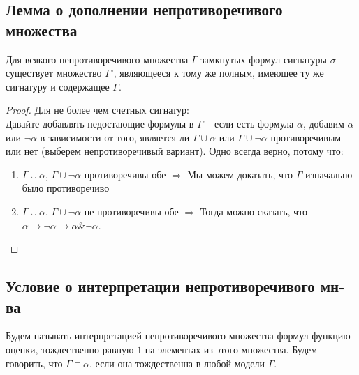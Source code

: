 \subsection{Лемма о дополнении непротиворечивого множества}
\label{sec-8-2}
\begin{lemma}
Для всякого непротиворечивого множества $\Gamma$ замкнутых формул сигнатуры $\sigma$ существует множество $\Gamma’$, являющееся к тому же полным, имеющее ту же сигнатуру и содержащее $\Gamma$.
\end{lemma}
\begin{proof}
Для не более чем счетных сигнатур:\\
Давайте добавлять недостающие формулы в $\Gamma$ -- если есть формула $\alpha$, добавим $\alpha$ или $\neg \alpha$ в зависимости от того, является ли $\Gamma \cup \alpha$ или $\Gamma \cup \neg \alpha$ противоречивым или нет (выберем непротиворечивый вариант). Одно всегда верно, потому что:
\begin{enumerate}
\item $\Gamma \cup \alpha$, $\Gamma \cup \neg \alpha$ противоречивы обе $\Rightarrow$ Мы можем доказать, что $\Gamma$ изначально было противоречиво
\item $\Gamma \cup \alpha$, $\Gamma \cup \neg \alpha$ не противоречивы обе $\Rightarrow$ Тогда можно сказать, что $\alpha \to \neg \alpha \to \alpha \& \neg \alpha$.
\end{enumerate}
\end{proof}
\subsection{Условие о интерпретации непротиворечивого мн-ва}
\label{sec-8-3}
Будем называть интерпретацией непротиворечивого множества формул функцию оценки, тождественно равную $1$ на элементах из этого множества. Будем говорить, что $\Gamma \models \alpha$, если она тождественна в любой модели $\Gamma$.
